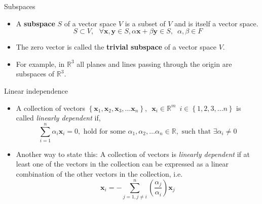 \documentclass[aspectratio=169]{beamer}
\let\olditem\item
\renewcommand{\item}{\setlength{\itemsep}{\fill}\olditem}
\begin{document}
\begin{frame}[t]{Subspaces}
\begin{itemize}
    \item A \textbf{subspace} $S$ of a vector space $V$ is a subset of $V$ and is itself a vector space.
    \[ S \subset V, \,\,\,\, \forall \mathbf{x}, \mathbf{y} \in S, \alpha \mathbf{x} + \beta \mathbf{y} \in S, \,\,\, \alpha, \beta \in F \]
    \item The zero vector is called the \textbf{trivial subspace} of a vector space $V$.
    \item For example, in $\mathbb{R}^3$ all planes and lines passing through the origin are subspaces of $\mathbb{R}^3$. 
\end{itemize}
\begin{center}
\end{center}
\end{frame}


\begin{frame}[t]{Linear independence}
\begin{itemize}
  \item A collection of vectors $\left\{\mathbf{x}_1, \mathbf{x}_2, \mathbf{x}_3, \ldots \mathbf{x}_n\right\}, \,\,\, \mathbf{x}_i \in \mathbb{R}^m \,\,\, i \in\left\{1, 2, 3, \ldots n\right\}$ is called \textit{linearly dependent} if,
  $$ \sum_{i=1}^n\alpha_i\mathbf{x}_i = 0, \text{ hold for some } \alpha_1, \alpha_2, \ldots \alpha_n \in \mathbb{R}, \text{ such that } \exists \alpha_i \neq 0 $$
  
  \item Another way to state this: A collection of vectors is \textit{linearly dependent} if at least one of the vectors in the collection can be expressed as a linear combination of the other vectors in the collection, i.e.
  $$\mathbf{x}_i = -\sum_{j=1, j\neq i}^{n}\left(\frac{\alpha_j}{\alpha_i}\right)\mathbf{x}_j$$
\end{itemize}
\end{frame}
\end{document}
